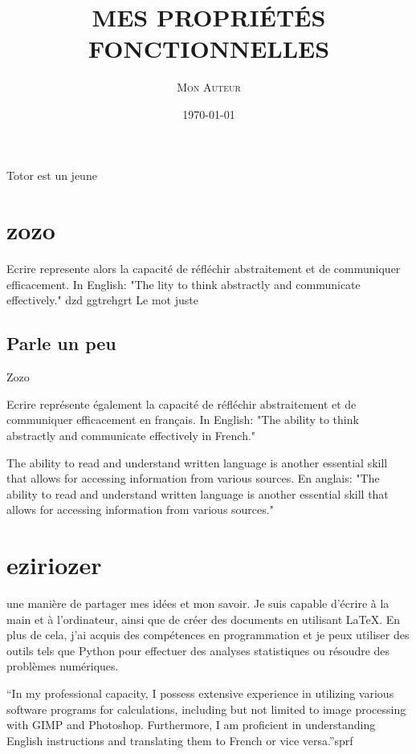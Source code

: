 \documentclass{article}
\title{\MakeUppercase{\textsc{Mes Propriétés Fonctionnelles}}}
\author{\textsc{Mon Auteur}}
\date{\today}
\begin{document}
\maketitle

Totor est un jeune

\section{zozo}

Ecrire represente alors la capacité de réfléchir abstraitement et de communiquer efficacement. In English: "The lity to think abstractly and communicate effectively." dzd ggtrehgrt
Le mot juste


\subsection{Parle un peu}
Zozo

Ecrire représente également la capacité de réfléchir abstraitement et de communiquer efficacement en français. In English: "The ability to think abstractly and communicate effectively in French."

The ability to read and understand written language is another essential skill that allows for accessing information from various sources. En anglais: "The ability to read and understand written language is another essential skill that allows for accessing information from various sources."


\section{eziriozer}

une manière de partager mes idées et mon savoir. Je suis capable d'écrire à la main et à l'ordinateur, ainsi que de créer des documents en utilisant LaTeX. En plus de cela, j'ai acquis des compétences en programmation et je peux utiliser des outils tels que Python pour effectuer des analyses statistiques ou résoudre des problèmes numériques.



 ``In my professional capacity, I possess extensive experience in utilizing various software programs for calculations, including but not limited to image processing with GIMP and Photoshop. Furthermore, I am proficient in understanding English instructions and translating them to French or vice versa.''sprf
\end{document}
